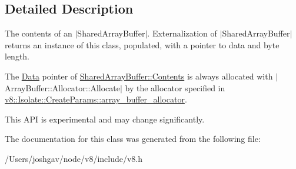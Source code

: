 \subsection{Detailed Description}
The contents of an $\vert$\+Shared\+Array\+Buffer$\vert$. Externalization of $\vert$\+Shared\+Array\+Buffer$\vert$ returns an instance of this class, populated, with a pointer to data and byte length.

The \hyperlink{classv8_1_1_data}{Data} pointer of \hyperlink{classv8_1_1_shared_array_buffer_1_1_contents}{Shared\+Array\+Buffer\+::\+Contents} is always allocated with $\vert$\+Array\+Buffer\+::\+Allocator\+::\+Allocate$\vert$ by the allocator specified in \hyperlink{structv8_1_1_isolate_1_1_create_params_a7c663f70b64290392eeaf164f57585f9}{v8\+::\+Isolate\+::\+Create\+Params\+::array\+\_\+buffer\+\_\+allocator}.

This A\+PI is experimental and may change significantly. 

The documentation for this class was generated from the following file\+:\begin{DoxyCompactItemize}
\item 
/\+Users/joshgav/node/v8/include/v8.\+h\end{DoxyCompactItemize}
